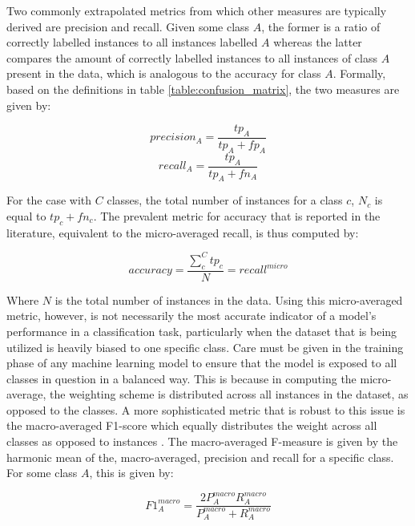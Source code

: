 \documentclass[../../fyp.tex]{subfiles}
\begin{document}
Two commonly extrapolated metrics from which other measures are typically derived are precision and recall. Given some class $A$, the former is a ratio of correctly labelled instances to all instances labelled $A$ whereas the latter compares the amount of correctly labelled instances to all instances of class $A$ present in the data, which is analogous to the accuracy for class $A$. Formally, based on the definitions in table \ref{table:confusion_matrix}, the two measures are given by:

\begin{equation} \label{eq:precision}
	precision_A = \frac{tp_A}{tp_A + fp_A}
\end{equation}
\begin{equation} \label{eq:recall}
	recall_A = \frac{tp_A}{tp_A + fn_A}
\end{equation}

For the case with $C$ classes, the total number of instances for a class $c$, $N_c$ is equal to $tp_c + fn_c$. The prevalent metric for accuracy that is reported in the literature, equivalent to the micro-averaged recall, is thus computed by:

\begin{equation} \label{eq:accuracy}
	accuracy = \frac{\sum_{c}^{C}tp_c}{N} = recall^{micro}
\end{equation}

Where $N$ is the total number of instances in the data. Using this micro-averaged metric, however, is not necessarily the most accurate indicator of a model's performance in a classification task, particularly when the dataset that is being utilized is heavily biased to one specific class. Care must be given in the training phase of any machine learning model to ensure that the model is exposed to all classes in question in a balanced way. This is because in computing the micro-average, the weighting scheme is distributed across all instances in the dataset, as opposed to the classes. A more sophisticated metric that is robust to this issue is the macro-averaged F1-score which equally distributes the weight across all classes as opposed to instances \cite{manning2010}. The macro-averaged F-measure is given by the harmonic mean of the, macro-averaged, precision and recall for a specific class. For some class $A$, this is given by:

\begin{equation} \label{eq:f1_measure}
	F1^{macro}_{A} = \frac{2P^{macro}_{A}R^{macro}_{A}}{P^{macro}_{A}+R^{macro}_{A}}
\end{equation}
\end{document}
